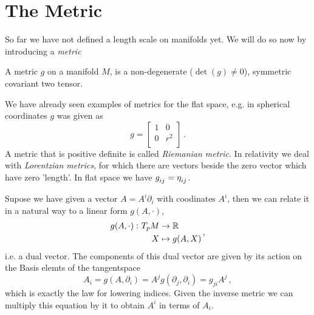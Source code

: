 \section{The Metric}
So far we have not defined a length scale on manifolds yet. We will do so now by
introducing a \emph{metric} 
\begin{definition}[Metric]
A metric $g$ on a manifold $M$, is a non-degenerate ($\det(g)\neq 0$), symmetric
covariant two tensor.
\end{definition}
We have already seen examples of metrics for the flat space, e.g. in spherical coordinates $g$ was given as
\begin{equation}
    g=
    \begin{bmatrix}
        1 & 0\\
        0 & r^2\\
    \end{bmatrix}\,.
\end{equation}
A metric that is positive definite is called \emph{Riemanian metric}. In
relativity we deal with \emph{Lorentzian metrics}, for which there are vectors
beside the zero vector which have zero 'length'. In flat space we have
$\tensor{g}{_i_j}=\tensor{\eta}{_i_j}$.
\begin{remark} Supose we have given a vector $A=A^i\partial_i$
with coodinates $A^i$, then we can relate it 
in a natural way to a linear form $g(A,\cdot)$,
\begin{equation}
\begin{split}
 g(A,\cdot)\,\colon T_pM &\to \mathbb{R}\\
 X &\mapsto g(A,X)
\end{split}\, ,
\end{equation}
i.e. a dual vector. The components of this dual vector are given by its action
on the Basis elemts of the tangentspace
\begin{equation}
A_i=g(A,\partial_i)=A^jg(\partial_j,\partial_i)=g_{ji}A^j\,,
\end{equation}
which is exactly the law for lowering indices. Given the inverse metric we can
multiply this equation by it to obtain $A^i$ in terms of $A_i$.
\end{remark}
